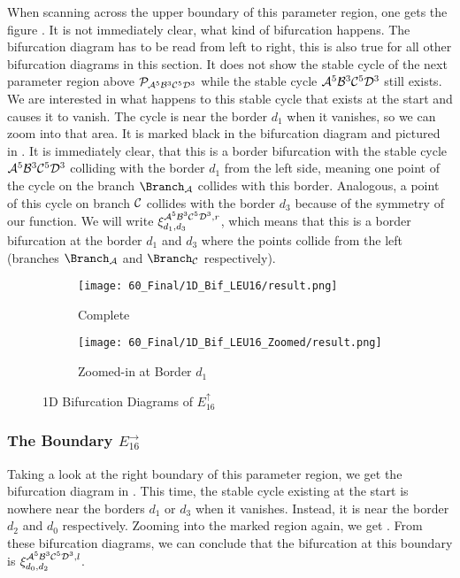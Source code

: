 When scanning across the upper boundary of this parameter region, one gets the figure .
It is not immediately clear, what kind of bifurcation happens.
The bifurcation diagram has to be read from left to right, this is also true for all other bifurcation diagrams in this section.
It does not show the stable cycle of the next parameter region above $\mathcal{P}_{\mathcal{A}^5\mathcal{B}^3\mathcal{C}^5\mathcal{D}^3}$ while the stable cycle $\mathcal{A}^5\mathcal{B}^3\mathcal{C}^5\mathcal{D}^3$ still exists.
We are interested in what happens to this stable cycle that exists at the start and causes it to vanish.
The cycle is near the border $d_1$ when it vanishes, so we can zoom into that area.
It is marked black in the bifurcation diagram and pictured in .
It is immediately clear, that this is a border bifurcation with the stable cycle $\mathcal{A}^5\mathcal{B}^3\mathcal{C}^5\mathcal{D}^3$ colliding with the border $d_1$ from the left side, meaning one point of the cycle on the branch $\Branch_\A$ collides with this border.
Analogous, a point of this cycle on branch $\mathcal{C}$ collides with the border $d_3$ because of the symmetry of our function.
We will write $\xi_{d_1, d_3}^{\mathcal{A}^5\mathcal{B}^3\mathcal{C}^5\mathcal{D}^3, r}$, which means that this is a border bifurcation at the border $d_1$ and $d_3$ where the points collide from the left (branches $\Branch_\A$ and $\Branch_\C$ respectively).

\begin{figure}
    \centering
    \begin{subfigure}{0.4\textwidth}
        \centering
        \texttt{[image: 60\_Final/1D\_Bif\_LEU16/result.png]}
        \caption{Complete}
        \label{fig:final.bifurcation.E.up}
    \end{subfigure}
    \begin{subfigure}{0.4\textwidth}
        \centering
        \texttt{[image: 60\_Final/1D\_Bif\_LEU16\_Zoomed/result.png]}
        \caption{Zoomed-in at Border $d_1$}
        \label{fig:bifurcation.E.up.zoomed}
    \end{subfigure}
    \caption{1D Bifurcation Diagrams of $E_{16}^\uparrow$}
\end{figure}

\subsubsection{The Boundary $E_{16}^\rightarrow$}

Taking a look at the right boundary of this parameter region, we get the bifurcation diagram in .
This time, the stable cycle existing at the start is nowhere near the borders $d_1$ or $d_3$ when it vanishes.
Instead, it is near the border $d_2$ and $d_0$ respectively.
Zooming into the marked region again, we get .
From these bifurcation diagrams, we can conclude that the bifurcation at this boundary is $\xi_{d_0, d_2}^{\mathcal{A}^5\mathcal{B}^3\mathcal{C}^5\mathcal{D}^3, l}$.

